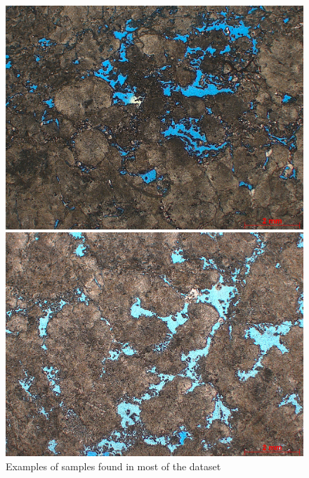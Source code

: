\documentclass[a4paper,fleqn]{cas-sc}
\begin{document}
\begin{figure}[h!]
	\caption{Examples of samples found in most of the dataset}
	\label{fig:normals}
	\centering%
	\begin{minipage}{0.3\textwidth}
		\includegraphics[width=\textwidth]{images/3-SPS-69_T01_4987,95_1,25x.jpg}
	\end{minipage}
	\begin{minipage}{0.3\textwidth}
		\includegraphics[width=\textwidth]{images/3-SPS-69_T01_4988,95_1,25x.jpg}
	\end{minipage}
	\begin{minipage}{0.3\textwidth}

\end{minipage}
\end{figure}
\end{document}
